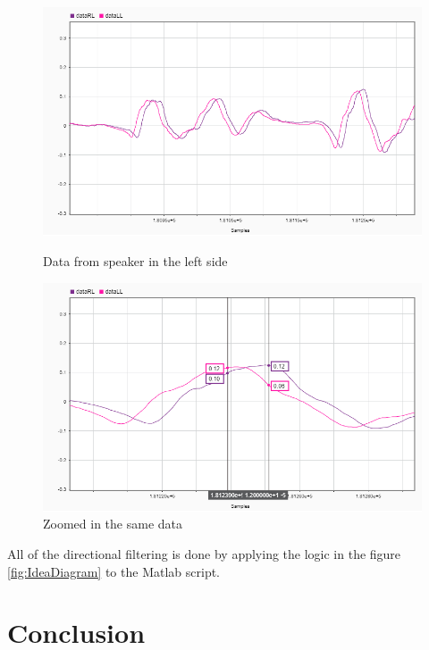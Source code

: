 \begin{figure}[htp]
\centering
\begin{minipage}{.5\textwidth}
  \centering
  \includegraphics[width=1\linewidth]{Illustrations/DataL.png}
  \caption{Data from speaker in the left side}
  \label{fig:L}
\end{minipage}%
\begin{minipage}{.5\textwidth}
  \centering
  \includegraphics[width=1\linewidth]{Illustrations/DataL_with_Markers.png}
  \caption{Zoomed in the same data}
  \label{fig:closeL}
\end{minipage}
\end{figure}


All of the directional filtering is done by applying the logic in the figure \ref{fig:IdeaDiagram} to the Matlab script. 

\section{Conclusion}
